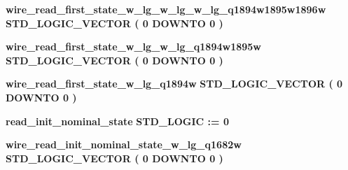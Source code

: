 \begin{DoxyCompactItemize}
\item 
{\bf wire\+\_\+read\+\_\+first\+\_\+state\+\_\+w\+\_\+lg\+\_\+w\+\_\+lg\+\_\+w\+\_\+lg\+\_\+q1894w1895w1896w} {\bfseries \textcolor{comment}{S\+T\+D\+\_\+\+L\+O\+G\+I\+C\+\_\+\+V\+E\+C\+T\+OR}\textcolor{vhdlchar}{ }\textcolor{vhdlchar}{(}\textcolor{vhdlchar}{ }\textcolor{vhdlchar}{ } \textcolor{vhdldigit}{0} \textcolor{vhdlchar}{ }\textcolor{keywordflow}{D\+O\+W\+N\+TO}\textcolor{vhdlchar}{ }\textcolor{vhdlchar}{ } \textcolor{vhdldigit}{0} \textcolor{vhdlchar}{ }\textcolor{vhdlchar}{)}\textcolor{vhdlchar}{ }} 
\item 
{\bf wire\+\_\+read\+\_\+first\+\_\+state\+\_\+w\+\_\+lg\+\_\+w\+\_\+lg\+\_\+q1894w1895w} {\bfseries \textcolor{comment}{S\+T\+D\+\_\+\+L\+O\+G\+I\+C\+\_\+\+V\+E\+C\+T\+OR}\textcolor{vhdlchar}{ }\textcolor{vhdlchar}{(}\textcolor{vhdlchar}{ }\textcolor{vhdlchar}{ } \textcolor{vhdldigit}{0} \textcolor{vhdlchar}{ }\textcolor{keywordflow}{D\+O\+W\+N\+TO}\textcolor{vhdlchar}{ }\textcolor{vhdlchar}{ } \textcolor{vhdldigit}{0} \textcolor{vhdlchar}{ }\textcolor{vhdlchar}{)}\textcolor{vhdlchar}{ }} 
\item 
{\bf wire\+\_\+read\+\_\+first\+\_\+state\+\_\+w\+\_\+lg\+\_\+q1894w} {\bfseries \textcolor{comment}{S\+T\+D\+\_\+\+L\+O\+G\+I\+C\+\_\+\+V\+E\+C\+T\+OR}\textcolor{vhdlchar}{ }\textcolor{vhdlchar}{(}\textcolor{vhdlchar}{ }\textcolor{vhdlchar}{ } \textcolor{vhdldigit}{0} \textcolor{vhdlchar}{ }\textcolor{keywordflow}{D\+O\+W\+N\+TO}\textcolor{vhdlchar}{ }\textcolor{vhdlchar}{ } \textcolor{vhdldigit}{0} \textcolor{vhdlchar}{ }\textcolor{vhdlchar}{)}\textcolor{vhdlchar}{ }} 
\item 
{\bf read\+\_\+init\+\_\+nominal\+\_\+state} {\bfseries \textcolor{comment}{S\+T\+D\+\_\+\+L\+O\+G\+IC}\textcolor{vhdlchar}{ }\textcolor{vhdlchar}{ }\textcolor{vhdlchar}{\+:}\textcolor{vhdlchar}{=}\textcolor{vhdlchar}{ }\textcolor{vhdlchar}{ }\textcolor{vhdlchar}{\textquotesingle{}}\textcolor{vhdlchar}{ } \textcolor{vhdldigit}{0} \textcolor{vhdlchar}{ }\textcolor{vhdlchar}{\textquotesingle{}}\textcolor{vhdlchar}{ }} 
\item 
{\bf wire\+\_\+read\+\_\+init\+\_\+nominal\+\_\+state\+\_\+w\+\_\+lg\+\_\+q1682w} {\bfseries \textcolor{comment}{S\+T\+D\+\_\+\+L\+O\+G\+I\+C\+\_\+\+V\+E\+C\+T\+OR}\textcolor{vhdlchar}{ }\textcolor{vhdlchar}{(}\textcolor{vhdlchar}{ }\textcolor{vhdlchar}{ } \textcolor{vhdldigit}{0} \textcolor{vhdlchar}{ }\textcolor{keywordflow}{D\+O\+W\+N\+TO}\textcolor{vhdlchar}{ }\textcolor{vhdlchar}{ } \textcolor{vhdldigit}{0} \textcolor{vhdlchar}{ }\textcolor{vhdlchar}{)}\textcolor{vhdlchar}{ }} 

\end{DoxyCompactItemize}
